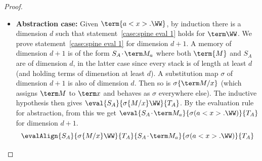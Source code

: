 \documentclass[a4paper,UKenglish,cleveref, autoref, thm-restate]{lipics-v2021}
\newcommand\case[1]{\textbf{#1}}
\newcommand\msep{\kern1pt{\cdot}\kern1pt}
\begin{document}
\begin{proof}
\begin{itemize}
\item\case{Abstraction case:}
Given $\term{a<x>.\WW}$, by induction there is a dimension $d$ such that statement~\ref{case:spine eval 1} holds for $\term\WW$. We prove statement~\ref{case:spine eval 1} for dimension $d+1$. A memory of dimension $d+1$ is of the form $S_A\msep\term M_a$ where both $\term{M}$ and $S_A$ are of dimension $d$, in the latter case since every stack is of length at least $d$ (and holding terms of dimenstion at least $d$). A substitution map $\sigma$ of dimension $d+1$ is also of dimension $d$. Then so is $\sigma\{\term M/x\}$ (which assigns $\term M$ to $\term x$ and behaves as $\sigma$ everywhere else). The inductive hypothesis then gives $\eval{S_A}{\sigma\{M/x\}\WW}{T_A}$. By the evaluation rule for abstraction, from this we get $\eval{S_A\msep\term M_a}{\sigma(a<x>.\WW)}{T_A}$ for dimension $d+1$.
\[
	\evalAlign
	   {S_A}              {\sigma\{M/x\}\WW} {T_A}
	   {S_A\msep\term M_a} {\sigma(a<x>.\WW)}{T_A}
\qedhere
\]
\end{itemize}
\end{proof}

\spineTermination*
\end{document}
